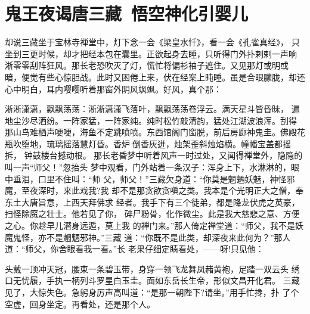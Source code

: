 \chapter{鬼王夜谒唐三藏~悟空神化引婴儿}

却说三藏坐于宝林寺禅堂中，灯下念一会《梁皇水忏》，看一会《孔雀真经》，
只坐到三更时候，却才把经本包在囊里。正欲起身去睡，只听得门外扑剌剌一声响
，淅零零刮阵狂风。那长老恐吹灭了灯，慌忙将偏衫袖子遮住。又见那灯或明或
暗，便觉有些心惊胆战。此时又困倦上来，伏在经案上盹睡。虽是合眼朦胧，却还
心中明白，耳内嘤嘤听着那窗外阴风飒飒。好风，真个那：

淅淅潇潇，飘飘荡荡：淅淅潇潇飞落叶，飘飘荡荡卷浮云。满天星斗皆昏昧，
遍地尘沙尽洒纷。一阵家猛，一阵家纯。纯时松竹敲清韵，猛处江湖波浪浑。刮得
那山鸟难栖声哽哽，海鱼不定跳喷喷。东西馆阁门窗脱，前后房廊神鬼圭。佛殿花
瓶吹堕地，琉璃摇落慧灯昏。香炉倒香灰迸，烛架歪斜烛焰横。幢幡宝盖都摇拆，
钟鼓楼台撼动根。
那长老昏梦中听着风声一时过处，又闻得禅堂外，隐隐的叫一声“师父！”忽抬头
梦中观看，门外站着一条汉子：浑身上下，水淋淋的，眼中垂泪，口里不住叫：“师
父，师父！”三藏欠身道：“你莫是魍魉妖魅，神怪邪魔，至夜深时，来此戏我?我
却不是那贪欲贪嗔之类。我本是个光明正大之僧，奉东土大唐旨意，上西天拜佛求
经者。我手下有三个徒弟，都是降龙伏虎之英豪，扫怪除魔之壮士。他若见了你，
碎尸粉骨，化作微尘。此是我大慈悲之意、方便之心。你趁早儿潜身远遁，莫上我
的禅门来。”那人倚定禅堂道：“师父，我不是妖魔鬼怪，亦不是魍魉邪神。”三藏
道：“你既不是此类，却深夜来此何为？”那人道：“师父，你舍眼看我一看。”长
老果仔细定睛看处，——呀!只见他：

头戴一顶冲天冠，腰束一条碧玉带，身穿一领飞龙舞凤赭黄袍，足踏一双云头
绣口无忧履，手执一柄列斗罗星白玉圭。面如东岳长生帝，形似文昌开化君。
三藏见了，大惊失色。急躬身厉声高叫道：“是那一朝陛下?请坐。”用手忙搀，扑
了个空虚，回身坐定。再看处，还是那个人。

